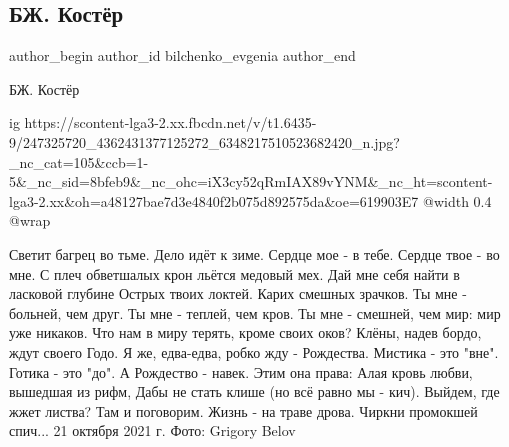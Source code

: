 
 
 
 
 
 
\subsection{БЖ. Костёр}
\label{sec:21_10_2021.fb.bilchenko_evgenia.1.koster}
 
\ifcmt
 author_begin
   author_id bilchenko_evgenia
 author_end
\fi

БЖ. Костёр

\ifcmt
  ig https://scontent-lga3-2.xx.fbcdn.net/v/t1.6435-9/247325720_4362431377125272_6348217510523682420_n.jpg?_nc_cat=105&ccb=1-5&_nc_sid=8bfeb9&_nc_ohc=iX3cy52qRmIAX89vYNM&_nc_ht=scontent-lga3-2.xx&oh=a48127bae7d3e4840f2b075d892575da&oe=619903E7
  @width 0.4
  @wrap 
\fi

Светит багрец во тьме. Дело идёт к зиме.
Сердце мое - в тебе. Сердце твое - во мне.
С плеч обветшалых крон льётся медовый мех.
Дай мне себя найти в ласковой глубине
Острых твоих локтей. Карих смешных зрачков.
Ты мне - больней, чем друг. 
Ты мне - теплей, чем кров.
Ты мне - смешней, чем мир: мир уже никаков.
Что нам в миру терять, кроме своих оков?
Клёны, надев бордо, ждут своего Годо.
Я же, едва-едва, робко жду - Рождества.
Мистика - это "вне". Готика - это "до".
А Рождество - навек. Этим она права:
Алая кровь любви, вышедшая из рифм,
Дабы не стать клише (но всё  равно мы - кич).
Выйдем, где жжет листва? Там и поговорим.
Жизнь - на траве дрова. 
Чиркни промокшей спич...
21 октября 2021 г.
Фото: Grigory Belov
